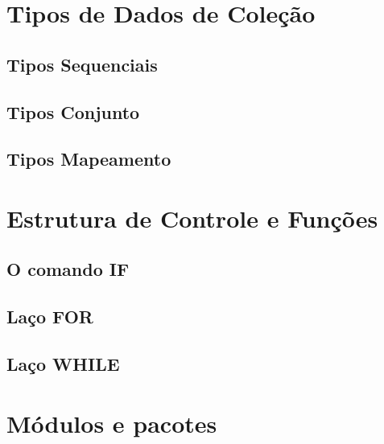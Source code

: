     \section{Tipos de Dados de Cole\c{c}\~{a}o}


            \subsection{Tipos Sequenciais}


            \subsection{Tipos Conjunto}


            \subsection{Tipos Mapeamento}




    \section{Estrutura de Controle e Fun\c{c}\~{o}es}

            \subsection{O comando IF}


            \subsection{La\c{c}o FOR}

            \subsection{La\c{c}o WHILE}


    \section{M\'{o}dulos e pacotes}




